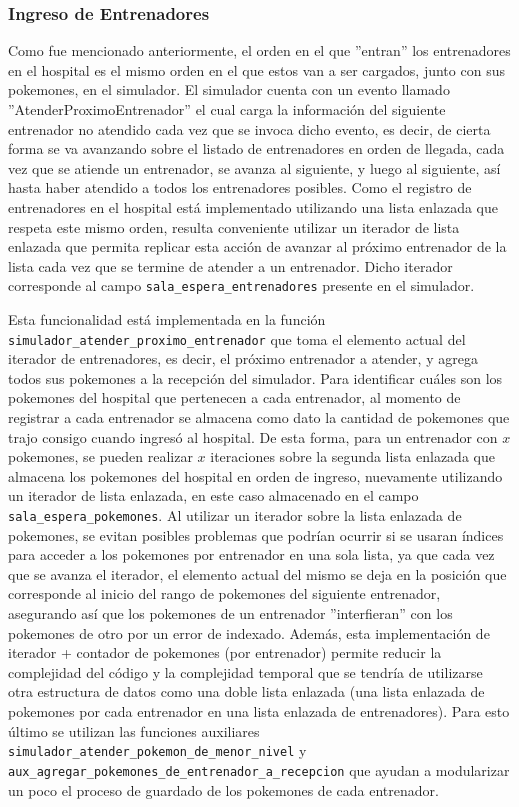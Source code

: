 \documentclass[titlepage,a4paper]{article}
\begin{document}
\subsubsection{Ingreso de Entrenadores}

Como fue mencionado anteriormente, el orden en el que ''entran'' los
entrenadores en el hospital es el mismo orden en el que estos van a ser
cargados, junto con sus pokemones, en el simulador. El simulador cuenta con un
evento llamado ''AtenderProximoEntrenador'' el cual carga la
información del siguiente entrenador no atendido cada vez que se invoca dicho
evento, es decir, de cierta forma se va avanzando sobre el listado de
entrenadores en orden de llegada, cada vez que se atiende un entrenador, se
avanza al siguiente, y luego al siguiente, así hasta haber atendido a todos los
entrenadores posibles. Como el registro de entrenadores en el hospital está
implementado utilizando una lista enlazada que respeta este mismo orden, resulta
conveniente utilizar un iterador de lista enlazada que permita replicar esta
acción de avanzar al próximo entrenador de la lista cada vez que se termine de
atender a un entrenador. Dicho iterador corresponde al campo
\lstinline{sala_espera_entrenadores} presente en el simulador.

Esta funcionalidad está implementada en la función \lstinline{simulador_atender_proximo_entrenador} que toma el elemento actual del iterador
de entrenadores, es decir, el próximo entrenador a atender, y agrega todos sus
pokemones a la recepción del simulador. Para identificar cuáles son los
pokemones del hospital que pertenecen a cada entrenador, al momento de registrar
a cada entrenador se almacena como dato la cantidad de pokemones que trajo
consigo cuando ingresó al hospital. De esta forma, para un entrenador con $x$
pokemones, se pueden realizar $x$ iteraciones sobre la segunda lista enlazada
que almacena los pokemones del hospital en orden de ingreso, nuevamente
utilizando un iterador de lista enlazada, en este caso almacenado en el
campo \lstinline{sala_espera_pokemones}. Al utilizar un iterador sobre la lista
enlazada de pokemones, se evitan posibles problemas que podrían ocurrir si se
usaran índices para acceder a los pokemones por entrenador en una sola lista, ya
que cada vez que se avanza el iterador, el elemento actual del mismo se deja en
la posición que corresponde al inicio del rango de pokemones del siguiente
entrenador, asegurando así que los pokemones de un entrenador ''interfieran''
con los pokemones de otro por un error de indexado. Además, esta implementación
de iterador + contador de pokemones (por entrenador) permite reducir la
complejidad del código y la complejidad temporal que se tendría de utilizarse 
otra estructura de datos como una doble lista enlazada (una lista enlazada de
pokemones por cada entrenador en una lista enlazada de entrenadores). Para esto
último se utilizan las funciones auxiliares
\lstinline{simulador_atender_pokemon_de_menor_nivel} y
\lstinline{aux_agregar_pokemones_de_entrenador_a_recepcion} que ayudan a
modularizar	un poco el proceso de guardado de los pokemones de cada entrenador.
\end{document}
